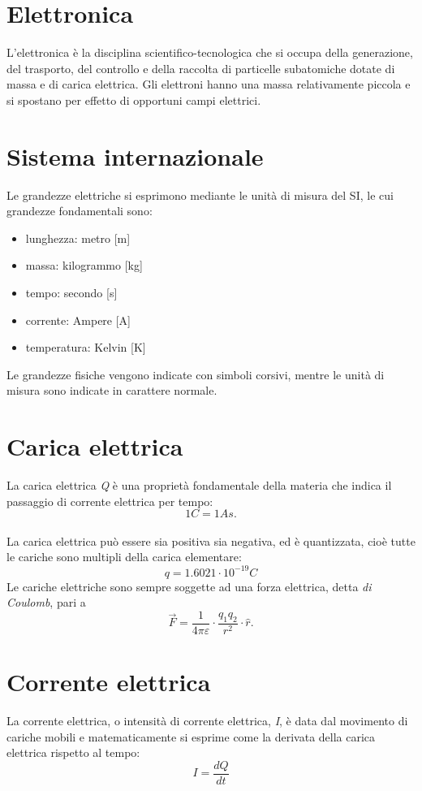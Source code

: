 \documentclass{article}
\begin{document}
        
    \section{Elettronica}
    	L'elettronica è la disciplina scientifico-tecnologica che si occupa della generazione, del trasporto, del controllo e della raccolta di particelle subatomiche dotate di massa e di carica elettrica.
    	Gli elettroni hanno una massa relativamente piccola e si spostano per effetto di opportuni campi elettrici. 
    	
    \section{Sistema internazionale}
    	Le grandezze elettriche si esprimono mediante le unità di misura del SI, le cui grandezze fondamentali sono: 
		\begin{itemize}
			\item lunghezza: metro [m]
			\item massa: kilogrammo [kg]
			\item tempo: secondo [s]
			\item corrente: Ampere [A]
			\item temperatura: Kelvin [K]
		\end{itemize}
		Le grandezze fisiche vengono indicate con simboli corsivi, mentre le unità di misura sono indicate in carattere normale. 
        
  	\section{Carica elettrica}
  		La carica elettrica \emph{Q} è una proprietà fondamentale della materia che indica il passaggio di corrente elettrica per tempo: \[ 1 C = 1 A s. \] \\
  		La carica elettrica può essere sia positiva sia negativa, ed è quantizzata, cioè tutte le cariche sono multipli della carica elementare: \[ q = 1.6021 \cdot 10^{-19} C \]  
  		Le cariche elettriche sono sempre soggette ad una forza elettrica, detta \emph{di Coulomb}, pari a \[ \vec{F} = \frac{1}{4\pi\varepsilon} \cdot \frac{q_1 q_2}{r^2} \cdot \hat{r}. \]
  		
  	\section{Corrente elettrica}
  		La corrente elettrica, o intensità di corrente elettrica, \emph{I}, è data dal movimento di cariche mobili e matematicamente si esprime come la derivata della carica elettrica rispetto al tempo: \[ I = \frac{dQ}{dt} \]
  		
\end{document}

